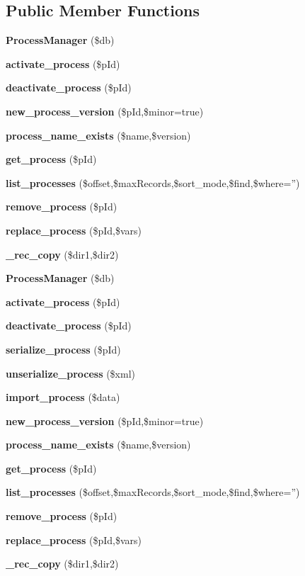 \subsection*{Public Member Functions}
\begin{CompactItemize}
\item 
{\bf Process\-Manager} (\$db)
\item 
{\bf activate\_\-process} (\$p\-Id)
\item 
{\bf deactivate\_\-process} (\$p\-Id)
\item 
{\bf new\_\-process\_\-version} (\$p\-Id,\$minor=true)
\item 
{\bf process\_\-name\_\-exists} (\$name,\$version)
\item 
{\bf get\_\-process} (\$p\-Id)
\item 
{\bf list\_\-processes} (\$offset,\$max\-Records,\$sort\_\-mode,\$find,\$where='')
\item 
{\bf remove\_\-process} (\$p\-Id)
\item 
{\bf replace\_\-process} (\$p\-Id,\$vars)
\item 
{}
{\bf \_\-rec\_\-copy} (\$dir1,\$dir2)\label{classProcessManager_a9}

\item 
{\bf Process\-Manager} (\$db)
\item 
{\bf activate\_\-process} (\$p\-Id)
\item 
{\bf deactivate\_\-process} (\$p\-Id)
\item 
{\bf serialize\_\-process} (\$p\-Id)
\item 
{\bf unserialize\_\-process} (\$xml)
\item 
{\bf import\_\-process} (\$data)
\item 
{\bf new\_\-process\_\-version} (\$p\-Id,\$minor=true)
\item 
{\bf process\_\-name\_\-exists} (\$name,\$version)
\item 
{\bf get\_\-process} (\$p\-Id)
\item 
{\bf list\_\-processes} (\$offset,\$max\-Records,\$sort\_\-mode,\$find,\$where='')
\item 
{\bf remove\_\-process} (\$p\-Id)
\item 
{\bf replace\_\-process} (\$p\-Id,\$vars)
\item 
{}
{\bf \_\-rec\_\-copy} (\$dir1,\$dir2)\label{classProcessManager_a22}


\end{CompactItemize}
